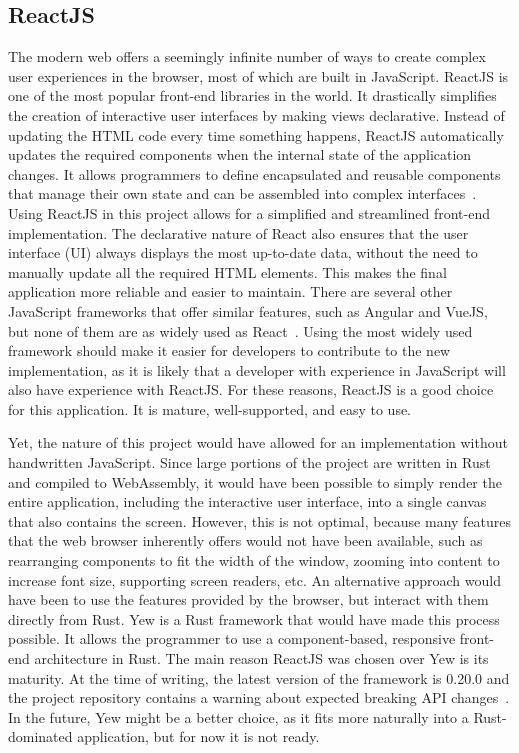 \subsection{ReactJS} \label{react-js}
The modern web offers a seemingly infinite number of ways to create complex user experiences in the browser, most of which are built in JavaScript.
ReactJS is one of the most popular front-end libraries in the world. It drastically simplifies the creation of interactive user interfaces by making views declarative.
Instead of updating the HTML code every time something happens, ReactJS automatically updates the required components when the internal state of the application changes.
It allows programmers to define encapsulated and reusable components that manage their own state and can be assembled into complex interfaces~\cite{reactweb}.
Using ReactJS in this project allows for a simplified and streamlined front-end implementation.
The declarative nature of React also ensures that the user interface (UI) always displays the most up-to-date data, without the need to manually update all the required HTML elements. This makes the final application more reliable and easier to maintain.
There are several other JavaScript frameworks that offer similar features, such as Angular and VueJS, but none of them are as widely used as React~\cite{webframework}.
Using the most widely used framework should make it easier for developers to contribute to the new implementation, as it is likely that a developer with experience in JavaScript will also have experience with ReactJS.
For these reasons, ReactJS is a good choice for this application. It is mature, well-supported, and easy to use.

Yet, the nature of this project would have allowed for an implementation without handwritten JavaScript.
Since large portions of the project are written in Rust and compiled to WebAssembly, it would have been possible to simply render the entire application, including the interactive user interface, into a single canvas that also contains the screen.
However, this is not optimal, because many features that the web browser inherently offers would not have been available, such as rearranging components to fit the width of the window, zooming into content to increase font size, supporting screen readers, etc.
An alternative approach would have been to use the features provided by the browser, but interact with them directly from Rust.
Yew is a Rust framework that would have made this process possible. It allows the programmer to use a component-based, responsive front-end architecture in Rust.
The main reason ReactJS was chosen over Yew is its maturity. At the time of writing, the latest version of the framework is 0.20.0 and the project repository contains a warning about expected breaking API changes~\cite{yewweb}.
In the future, Yew might be a better choice, as it fits more naturally into a Rust-dominated application, but for now it is not ready.

